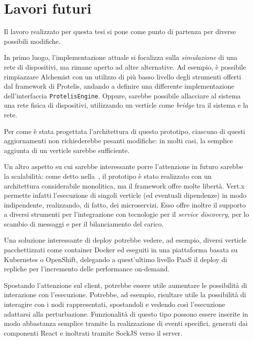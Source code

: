 \chapter{Lavori futuri}\label{ch:future}

  Il lavoro realizzato per questa tesi si pone come punto di partenza per diverse possibili modifiche.

  In primo luogo, l'implementazione attuale si focalizza sulla \emph{simulazione} di una rete di dispositivi, ma rimane aperto ad altre alternative.
  Ad esempio, è possibile rimpiazzare Alchemist con un utilizzo di più basso livello degli strumenti offerti dal framework di Protelis, andando a definire una differente implementazione dell'interfaccia \texttt{ProtelisEngine}.
  Oppure, sarebbe possibile allacciare al sistema una rete fisica di dispositivi, utilizzando un verticle come \emph{bridge} tra il sistema e la rete.

  Per come è stata progettata l'architettura di questo prototipo, ciascuno di questi aggiornamenti non richiederebbe pesanti modifiche:
  in molti casi, la semplice aggiunta di un verticle sarebbe sufficiente.

  Un altro aspetto su cui sarebbe interessante porre l'attenzione in futuro sarebbe la scalabilità:
  come detto nella~, il prototipo è stato realizzato con un architettura considerabile monolitica, ma il framework offre molte libertà.
  Vert.x permette infatti l'esecuzione di singoli verticle (ed eventuali dipendenze) in modo indipendente, realizzando, di fatto, dei microservizi.
  Esso offre inoltre il supporto a diversi strumenti per l'integrazione con tecnologie per il \emph{service discovery}, per lo scambio di messaggi e per il bilanciamento del carico.

  Una soluzione interessante di deploy potrebbe vedere, ad esempio, diversi verticle pacchettizzati come container Docker ed eseguiti in una piattaforma basata su Kubernetes o OpenShift,
  delegando a quest'ultimo livello PaaS il deploy di repliche per l'incremento delle performance on-demand.

  Spostando l'attenzione sul client, potrebbe essere utile aumentare le possibilità di interazione con l'esecuzione.
  Potrebbe, ad esempio, risultare utile la possibilità di interagire con i nodi rappresentati, spostandoli e vedendo così l'esecuzione adattarsi alla perturbazione.
  Funzionalità di questo tipo possono essere inserite in modo abbastanza semplice tramite la realizzazione di eventi specifici, generati dai componenti React e inoltrati tramite SockJS verso il server.

